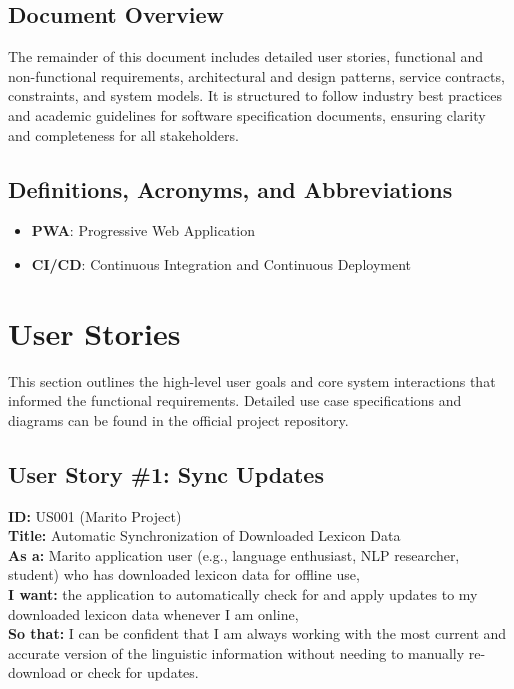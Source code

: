 \documentclass[12pt]{article}
\begin{document}
\subsection{Document Overview}
The remainder of this document includes detailed user stories, functional and non-functional requirements, architectural and design patterns, service contracts, constraints, and system models. It is structured to follow industry best practices and academic guidelines for software specification documents, ensuring clarity and completeness for all stakeholders.

\subsection{Definitions, Acronyms, and Abbreviations}
\begin{itemize}
    \item \textbf{PWA}: Progressive Web Application
    \item \textbf{CI/CD}: Continuous Integration and Continuous Deployment
\end{itemize}


\section{User Stories}
This section outlines the high-level user goals and core system interactions that informed the functional requirements. Detailed use case specifications and diagrams can be found in the official project repository.

\subsection{User Story \#1: Sync Updates}

\textbf{ID:} US001 (Marito Project) \\
\textbf{Title:} Automatic Synchronization of Downloaded Lexicon Data \\
\textbf{As a:} Marito application user (e.g., language enthusiast, NLP researcher, student) who has downloaded lexicon data for offline use, \\
\textbf{I want:} the application to automatically check for and apply updates to my downloaded lexicon data whenever I am online, \\
\textbf{So that:} I can be confident that I am always working with the most current and accurate version of the linguistic information without needing to manually re-download or check for updates.
\end{document}

